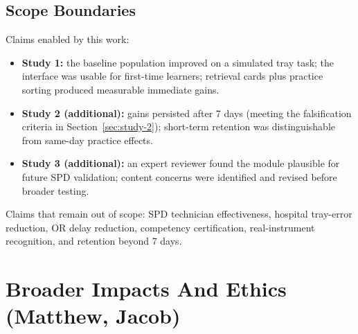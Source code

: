 \documentclass[10pt,a4paper]{article}
\begin{document}
\subsection{Scope Boundaries}
Claims enabled by this work:
\begin{itemize}
  \item[] \textbf{Study 1:} the baseline population improved on a simulated tray task; the interface was usable for first-time learners; retrieval cards plus practice sorting produced measurable immediate gains.
  \item[] \textbf{Study 2 (additional):} gains persisted after 7 days (meeting the falsification criteria in Section~\ref{sec:study-2}); short-term retention was distinguishable from same-day practice effects.
  \item[] \textbf{Study 3 (additional):} an expert reviewer found the module plausible for future SPD validation; content concerns were identified and revised before broader testing.
\end{itemize}
Claims that remain out of scope: SPD technician effectiveness, hospital tray-error reduction, OR delay reduction, competency certification, real-instrument recognition, and retention beyond 7 days.



\section{Broader Impacts And Ethics \hfill {\normalfont\small (Matthew, Jacob)}}
\label{sec:broader-impacts-and-ethics}
\end{document}
